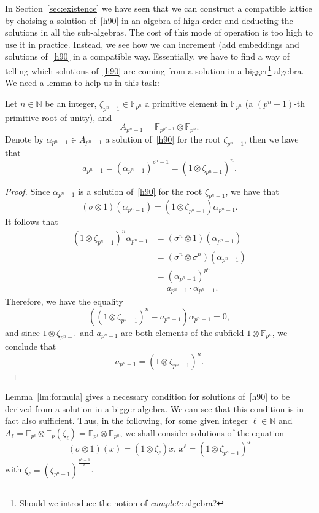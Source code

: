 \documentclass[a4paper,11pt]{article}
\begin{document}
In Section~\ref{sec:existence} we have seen that we can construct a compatible
lattice by choising a solution of~\eqref{h90} in an algebra of high order and
deducting the solutions in all the sub-algebras. The cost of this mode of
operation is too high to use it in practice. Instead, we see how we can
increment (\ie add embeddings and solutions of~\eqref{h90} in a compatible way.
Essentially, we have to find a way of telling which solutions of~\eqref{h90} are
coming from a solution in a bigger\footnote{Should we introduce the notion of 
\emph{complete} algebra?} algebra. We need a lemma to help us in this task:
\begin{lm}
  \label{lm:formula}
  Let $n\in\mathbb{N}$ be an integer, $\zeta_{p^n-1}\in\mathbb{F}_{p^n}$ a
  primitive element in $\mathbb{F}_{p^n}$ (\ie a $(p^n-1)$-th primitive root of
  unity), and 
  \[
    A_{p^n-1} = \mathbb{F}_{p^{p^n-1}}\otimes\mathbb{F}_{p^n}.
  \]
  Denote by $\alpha_{p^n-1}\in A_{p^{n}-1}$ a solution of~\eqref{h90} for the
  root $\zeta_{p^n-1}$, then we have that
  \[
    a_{p^n-1} = (\alpha_{p^n-1})^{p^n-1} = (1\otimes\zeta_{p^n-1})^n.
  \]
\end{lm}
\begin{proof}
  Since $\alpha_{p^n-1}$ is a solution of~\eqref{h90} for the root
  $\zeta_{p^n-1}$, we have that
  \[
    (\sigma\otimes 1)(\alpha_{p^n-1}) =
    (1\otimes\zeta_{p^n-1})\alpha_{p^n-1}.
  \]
  It follows that
  \begin{align*}
    (1\otimes\zeta_{p^n-1})^n \alpha_{p^n-1} &= (\sigma^n\otimes1)(\alpha_{p^n-1})\\
    &= (\sigma^n\otimes\sigma^n)(\alpha_{p^n-1})\\
    &= (\alpha_{p^n-1})^{p^n}\\
    &= a_{p^n-1}\cdot\alpha_{p^n-1}.
  \end{align*}
  Therefore, we have the equality
  \[
    ( (1\otimes\zeta_{p^n-1})^n - a_{p^n-1})\alpha_{p^n-1} = 0,
  \]
  and since $1\otimes\zeta_{p^n-1}$ and $a_{p^n-1}$ are both elements of the
  subfield $1\otimes\mathbb{F}_{p^n}$, we conclude that 
  \[
    a_{p^n-1} = (1\otimes\zeta_{p^n-1})^n.
  \]
\end{proof}
Lemma~\ref{lm:formula} gives a necessary condition for solutions of~\eqref{h90}
to be derived from a solution in a bigger algebra. We can see that this condition is in fact
also sufficient. Thus, in the following, for some given integer
$\ell\in\mathbb{N}$ and $A_\ell =
\mathbb{F}_{p^\ell}\otimes\mathbb{F}_{p}(\zeta_\ell) =
\mathbb{F}_{p^\ell}\otimes\mathbb{F}_{p^a}$, we shall consider solutions of the
equation
\begin{equation}
  \tag{H90$^\star$}
  (\sigma\otimes1)(x) = (1\otimes\zeta_\ell)x,\,x^\ell =
  (1\otimes\zeta_{p^a-1})^a
  \label{h90s}
\end{equation}
with $\zeta_\ell=(\zeta_{p^a-1})^{\frac{p^a-1}{\ell}}$.
\end{document}
